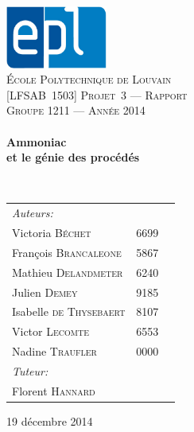 \begin{titlepage}
\begin{center}

\includegraphics[width=0.25\textwidth]{img/epl-logo}~\\[1cm]

\textsc{\LARGE École Polytechnique de Louvain}\\[0.7cm]
\textsc{\Large [LFSAB~1503] Projet~3 --- Rapport}\\[0.8cm]

\textsc{\Large Groupe 1211 --- Année 2014}\\[0.5cm]

\HRule \\[0.3cm]
{ \huge \bfseries Ammoniac \\ et le génie des procédés \\[0.3cm] }

\HRule \\[0.8cm]

{\large
\begin{tabu} to 0.7\linewidth {Xll}
    \emph{Auteurs:}\\
    \quad Victoria \textsc{Béchet} & 6699\\
    \quad François \textsc{Brancaleone} & 5867\\
    \quad Mathieu \textsc{Delandmeter} & 6240\\
    \quad Julien \textsc{Demey} & 9185\\
    \quad Isabelle \textsc{de Thysebaert} & 8107\\
    \quad Victor \textsc{Lecomte} & 6553\\
    \quad Nadine \textsc{Traufler} & 0000\\[.5ex]
    
    \emph{Tuteur:}\\
    \quad Florent \textsc{Hannard}\\
\end{tabu}
}

\vfill

{\large 19 décembre 2014}

\end{center}
\end{titlepage}
